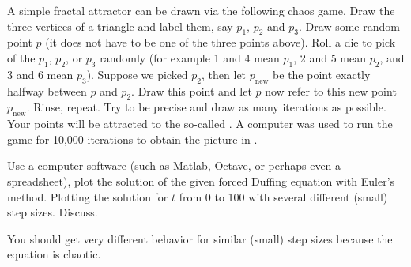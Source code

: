\begin{samepage}
\begin{exercise}[project]
A simple fractal attractor can be drawn via the following chaos game.  Draw
the three
vertices of a triangle and label them, say $p_1$, $p_2$
and $p_3$.  Draw some
random point $p$ (it does not have to be one of the three points above).
Roll a die to pick of the $p_1$, $p_2$, or $p_3$
randomly (for example 1 and 4 mean $p_1$, 2 and 5 mean $p_2$, and 3 and 6
mean $p_3$).  Suppose we picked $p_2$, then let $p_{\text{new}}$ be the
point exactly halfway between $p$ and $p_2$.  Draw this point and let $p$
now refer to this new point $p_{\text{new}}$.  Rinse, repeat.  Try to be
precise and draw as many iterations as possible.  Your points will be
attracted to the so-called \emph{}.  A computer
was used to run the game for 10,000 iterations to obtain the picture in
.
\end{exercise}
\end{samepage}

\begin{myfig}
\capstart
{}
\caption{10,000 iterations of the chaos game producing the 
Sierpinski triangle. \label{nlin:sierpinski}}
\end{myfig}


\begin{exercise}
Use a computer software (such as Matlab, Octave, or
perhaps even a spreadsheet), plot the solution
of the given forced Duffing equation with Euler's method.  Plotting the
solution for $t$ from 0 to 100 with several different (small) step sizes.
Discuss.
\end{exercise}
\comboSol{%
}
{%
You should get very different behavior for similar (small) step sizes because the equation is chaotic. 
}


